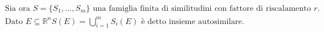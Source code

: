 \documentclass[preview]{standalone}
\begin{document}
\begin{align*}
\text{Sia ora }S = \{S_1, \dots, S_m\} \text{ una famiglia finita di similitudini con fattore di riscalamento } r.\\ \text{Dato } E \subseteq \mathbb{R}^n S(E) = \bigcup_{i=1}^m S_i(E) \text{ è detto insieme autosimilare.}
\end{align*}
\end{document}
